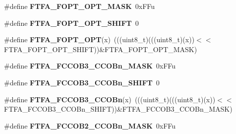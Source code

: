 \begin{DoxyCompactItemize}
\item 
\mbox{\label{group___f_t_f_a___register___masks_ga779df0be2be88c60f0c9e8e98850d479}} 
\#define {\bfseries F\+T\+F\+A\+\_\+\+F\+O\+P\+T\+\_\+\+O\+P\+T\+\_\+\+M\+A\+SK}~0x\+F\+Fu
\item 
\mbox{\label{group___f_t_f_a___register___masks_ga89bbb59793ccc7cb270b4a285c73062f}} 
\#define {\bfseries F\+T\+F\+A\+\_\+\+F\+O\+P\+T\+\_\+\+O\+P\+T\+\_\+\+S\+H\+I\+FT}~0
\item 
\mbox{\label{group___f_t_f_a___register___masks_ga490833607b9534df37400600d5e4a1dd}} 
\#define {\bfseries F\+T\+F\+A\+\_\+\+F\+O\+P\+T\+\_\+\+O\+PT}(x)~(((uint8\+\_\+t)(((uint8\+\_\+t)(x))$<$$<$F\+T\+F\+A\+\_\+\+F\+O\+P\+T\+\_\+\+O\+P\+T\+\_\+\+S\+H\+I\+FT))\&F\+T\+F\+A\+\_\+\+F\+O\+P\+T\+\_\+\+O\+P\+T\+\_\+\+M\+A\+SK)
\item 
\mbox{\label{group___f_t_f_a___register___masks_gae1057e6e0ff5441696b4246e99fbd33f}} 
\#define {\bfseries F\+T\+F\+A\+\_\+\+F\+C\+C\+O\+B3\+\_\+\+C\+C\+O\+Bn\+\_\+\+M\+A\+SK}~0x\+F\+Fu
\item 
\mbox{\label{group___f_t_f_a___register___masks_ga0ee905ea83a52a6a22d12666387f266b}} 
\#define {\bfseries F\+T\+F\+A\+\_\+\+F\+C\+C\+O\+B3\+\_\+\+C\+C\+O\+Bn\+\_\+\+S\+H\+I\+FT}~0
\item 
\mbox{\label{group___f_t_f_a___register___masks_gaab7c14d906b7e4a47fde00d6aaa1ecdf}} 
\#define {\bfseries F\+T\+F\+A\+\_\+\+F\+C\+C\+O\+B3\+\_\+\+C\+C\+O\+Bn}(x)~(((uint8\+\_\+t)(((uint8\+\_\+t)(x))$<$$<$F\+T\+F\+A\+\_\+\+F\+C\+C\+O\+B3\+\_\+\+C\+C\+O\+Bn\+\_\+\+S\+H\+I\+FT))\&F\+T\+F\+A\+\_\+\+F\+C\+C\+O\+B3\+\_\+\+C\+C\+O\+Bn\+\_\+\+M\+A\+SK)
\item 
\mbox{\label{group___f_t_f_a___register___masks_gafce9dd30cc49db588976cffd40ff31a3}} 
\#define {\bfseries F\+T\+F\+A\+\_\+\+F\+C\+C\+O\+B2\+\_\+\+C\+C\+O\+Bn\+\_\+\+M\+A\+SK}~0x\+F\+Fu
\item 
\mbox{\label{group___f_t_f_a___register___masks_gaf5731dc9ee3c6ce6fdd7c31a20bb0e6c}} 

\end{DoxyCompactItemize}
